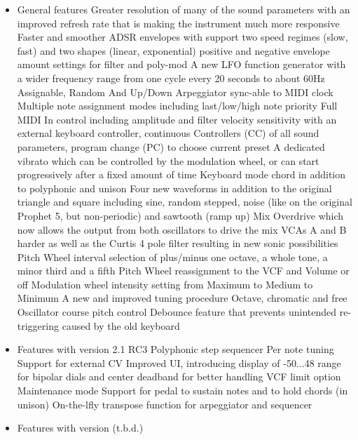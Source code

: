\documentclass[draft,landscape, 11pt, oneside]{report}
\newenvironment{flowtext}{\addmargin[0cm]{7cm}}{\endaddmargin} %
\begin{document}
\begin{flowtext}
\begin{itemize}
  \setlength\itemsep{0cm}
  \item{General features}
  \subitem Greater resolution of many of the sound parameters with an improved refresh rate that is making the instrument much more responsive
  \subitem Faster and smoother ADSR envelopes with support two speed regimes (slow, fast) and two shapes (linear, exponential)
  \subitem positive and negative envelope amount settings for filter and poly-mod
  \subitem A new LFO function generator with a wider frequency range from one cycle every 20 seconds to about 60Hz
  \subitem Assignable, Random And Up/Down Arpeggiator sync-able to MIDI clock
  \subitem Multiple note assignment modes including last/low/high note priority
  \subitem Full MIDI In control including amplitude and filter velocity sensitivity with an external keyboard controller, continuous Controllers (CC) of all sound parameters, program change (PC) to choose current preset
  \subitem A dedicated vibrato which can be controlled by the modulation wheel, or can start progressively after a fixed amount of time
  \subitem Keyboard mode chord in addition to polyphonic and unison  
  \subitem Four new waveforms in addition to the original triangle and square including sine, random stepped, noise (like on the original Prophet 5, but non-periodic) and sawtooth (ramp up)
  \subitem Mix Overdrive which now allows the output from both oscillators to drive the mix VCAs A and B harder as well as the Curtis 4 pole filter resulting in new sonic possibilities
  \subitem Pitch Wheel interval selection of plus/minus one octave, a whole tone, a minor third and a fifth
  \subitem Pitch Wheel reassignment to the VCF and Volume or off   
  \subitem Modulation wheel intensity setting from Maximum to Medium to Minimum
  \subitem A new and improved tuning procedure
  \subitem Octave, chromatic and free Oscillator course pitch control
  \subitem Debounce feature that prevents unintended re-triggering caused by the old keyboard
  \item Features with version 2.1 RC3
  \subitem Polyphonic step sequencer
  \subitem Per note tuning
  \subitem Support for external CV
  \subitem Improved UI, introducing display of -50...48 range for bipolar dials and center deadband for better handling  
  \subitem VCF limit option
  \subitem Maintenance mode
  \subitem Support for pedal to sustain notes and to hold chords (in unison)
  \subitem On-the-lfly transpose function for arpeggiator and sequencer
  \item Features with version (t.b.d.)

\end{itemize}
\end{flowtext}
\end{document}
